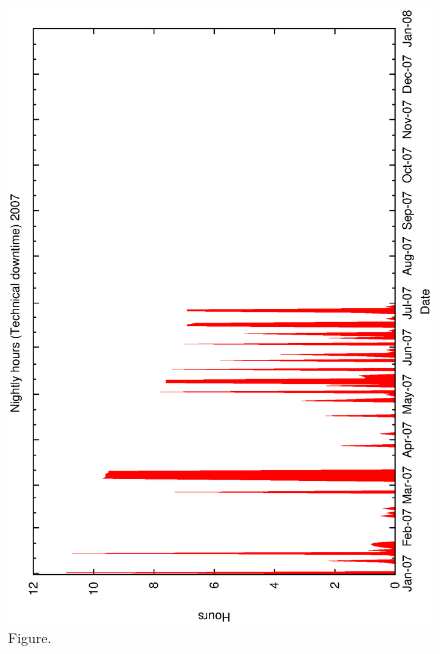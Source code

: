 \documentclass[12pt,a4paper]{article}
\begin{document}
\begin{figure}[htbp]
 \begin{center}
  \includegraphics[scale=1.0, angle=0]{figures/met_nightly_stats_tech2007.eps}
 \end{center}
  \caption[Figure.]
{Figure.}
\end{figure}
\clearpage
\end{document}
